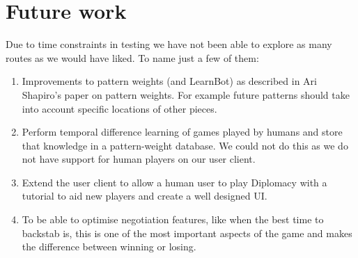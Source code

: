 \documentclass[pdftex,11pt,a4paper]{report}
\begin{document}
\section{Future work}

Due to time constraints in testing we have not been able to explore as
many routes as we would have liked. To name just a few of them: 
\\
\begin{enumerate}

\item Improvements to pattern weights (and LearnBot) as described in
  Ari Shapiro's paper on pattern weights. For example future patterns
  should take into account specific locations of other pieces.

\item Perform temporal difference learning of games played by humans
  and store that knowledge in a pattern-weight database. We could not
  do this as we do not have support for human players on our user
  client.

\item Extend the user client to allow a human user to play Diplomacy
  with a tutorial to aid new players and create a well designed UI.
\item To be able to optimise negotiation features, like when the best
  time to backstab is, this is one of the most important aspects of
  the game and makes the difference between winning or losing.

\end{enumerate}


 
\end{document}
